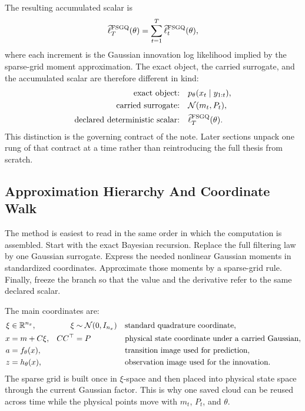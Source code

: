 \documentclass[11pt]{article}
\numberwithin{equation}{section}
\newcommand{\R}{\mathbb R}
\newcommand{\N}{\mathcal N}
\newcommand{\ellhat}{\widehat\ell}
\begin{document}
The resulting accumulated scalar is
\begin{equation}
  \ellhat_T^{\rm FSGQ}(\theta)
  =
  \sum_{t=1}^T \ellhat_t^{\rm FSGQ}(\theta),
  \label{eq:p32-one-page-scalar}
\end{equation}
where each increment is the Gaussian innovation log likelihood implied by the
sparse-grid moment approximation.  The exact object, the carried surrogate, and
the accumulated scalar are therefore different in kind:
\begin{equation}
\begin{aligned}
  \text{exact object:}
  &\quad p_\theta(x_t\mid y_{1:t}), \\
  \text{carried surrogate:}
  &\quad \N(m_t,P_t), \\
  \text{declared deterministic scalar:}
  &\quad \ellhat_T^{\rm FSGQ}(\theta).
\end{aligned}
  \label{eq:p32-exact-vs-approximate-summary}
\end{equation}
This distinction is the governing contract of the note.  Later sections unpack
one rung of that contract at a time rather than reintroducing the full thesis
from scratch.

\subsection{Approximation Hierarchy And Coordinate Walk}
\label{sec:p32-hierarchy}

The method is easiest to read in the same order in which the computation is
assembled.  Start with the exact Bayesian recursion.  Replace the full filtering
law by one Gaussian surrogate.  Express the needed nonlinear Gaussian moments in
standardized coordinates.  Approximate those moments by a sparse-grid rule.
Finally, freeze the branch so that the value and the derivative refer to the same
declared scalar.

The main coordinates are:
\begin{align}
  \xi &\in \R^{n_x},
  &\xi&\sim\N(0,I_{n_x})
  &&\hbox{standard quadrature coordinate},
  \label{eq:p32-standard-coordinate}\\
  x &= m+C\xi,
  &CC^\top&=P
  &&\hbox{physical state coordinate under a carried Gaussian},
  \label{eq:p32-physical-coordinate}\\
  a &= f_\theta(x),
  &&
  &&\hbox{transition image used for prediction},
  \label{eq:p32-transition-coordinate}\\
  z &= h_\theta(x),
  &&
  &&\hbox{observation image used for the innovation}.
  \label{eq:p32-observation-coordinate}
\end{align}
The sparse grid is built once in \(\xi\)-space and then placed into physical
state space through the current Gaussian factor.  This is why one saved cloud can
be reused across time while the physical points move with \(m_t\), \(P_t\), and
\(\theta\).
\end{document}
